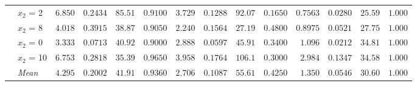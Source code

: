 \begin{table}[htbp]
\begin{tabular}{llrrrrrrrrrrrr}
 & $x_2$ = 2 & $6.850$ & $0.2434$ & $85.51$ & {\boldmath$0.9100$} & $3.729$ & $0.1288$ & $92.07$ & $0.1650$ & {\boldmath$0.7563$} & {\boldmath$0.0280$} & {\boldmath$25.59$} & $1.000$ \\
 & $x_2$ = 8 & $4.018$ & $0.3915$ & $38.87$ & {\boldmath$0.9050$} & $2.240$ & $0.1564$ & {\boldmath$27.19$} & $0.4800$ & {\boldmath$0.8975$} & {\boldmath$0.0521$} & $27.75$ & $1.000$ \\
 & $x_2$ = 0 & $3.333$ & $0.0713$ & $40.92$ & {\boldmath$0.9000$} & $2.888$ & $0.0597$ & $45.91$ & $0.3400$ & {\boldmath$1.096$} & {\boldmath$0.0212$} & {\boldmath$34.81$} & $1.000$ \\
 & $x_2$ = 10 & $6.753$ & $0.2818$ & $35.39$ & {\boldmath$0.9650$} & $3.958$ & $0.1764$ & $106.1$ & $0.3000$ & {\boldmath$2.984$} & {\boldmath$0.1347$} & {\boldmath$34.58$} & $1.000$ \\
 & \textit{Mean} & $4.295$ & $0.2002$ & $41.91$ & \colorbox{green!20}{\boldmath$0.9360$} & $2.706$ & $0.1087$ & $55.61$ & $0.4250$ & \colorbox{green!20}{\boldmath$1.350$} & \colorbox{green!20}{\boldmath$0.0546$} & \colorbox{green!20}{\boldmath$30.60$} & $1.000$ \\
\bottomrule
\end{tabular}
\end{table}
